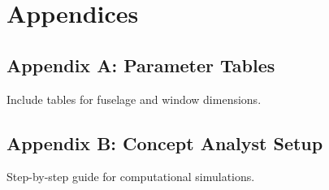 \documentclass[a4paper,11pt]{article}
\begin{document}
\newpage

\section*{Appendices}
\subsection*{Appendix A: Parameter Tables}
Include tables for fuselage and window dimensions.

\subsection*{Appendix B: Concept Analyst Setup}
Step-by-step guide for computational simulations.
\end{document}
